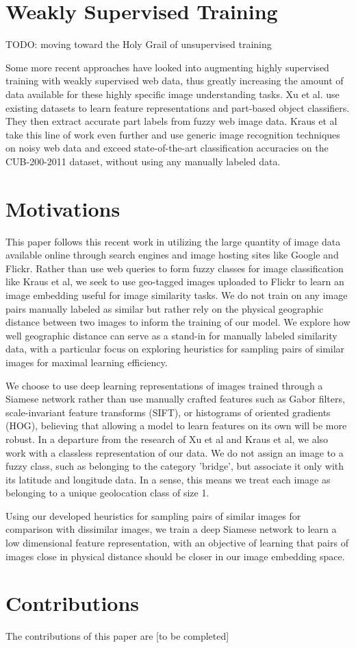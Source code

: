\section{Weakly Supervised Training}
TODO: moving toward the Holy Grail of unsupervised training

Some more recent approaches have looked into augmenting highly supervised training with weakly supervised web data, thus greatly increasing the amount of data available for these highly specific image understanding tasks. Xu et al.\cite{xu2015augmenting} use existing datasets to learn feature representations and part-based object classifiers. They then extract accurate part labels from fuzzy web image data. Kraus et al take this line of work even further and use generic image recognition techniques on noisy web data and exceed state-of-the-art classification accuracies on the CUB-200-2011 dataset, without using any manually labeled data.\cite{krause2016unreasonable}

\section{Motivations}
This paper follows this recent work in utilizing the large quantity of image data available online through search engines and image hosting sites like Google and Flickr. Rather than use web queries to form fuzzy classes for image classification like Kraus et al, we seek to use geo-tagged images uploaded to Flickr to learn an image embedding useful for image similarity tasks. We do not train on any image pairs manually labeled as similar but rather rely on the physical geographic distance between two images to inform the training of our model. We explore how well geographic distance can serve as a stand-in for manually labeled similarity data, with a particular focus on exploring heuristics for sampling pairs of similar images for maximal learning efficiency.

We choose to use deep learning representations of images trained through a Siamese network rather than use manually crafted features such as Gabor filters, scale-invariant feature transforms (SIFT), or histograms of oriented gradients (HOG), believing that allowing a model to learn features on its own will be more robust. In a departure from the research of Xu et al and Kraus et al, we also work with a classless representation of our data. We do not assign an image to a fuzzy class, such as belonging to the category 'bridge', but associate it only with its latitude and longitude data. In a sense, this means we treat each image as belonging to a unique geolocation class of size 1.

Using our developed heuristics for sampling pairs of similar images for comparison with dissimilar images, we train a deep Siamese network to learn a low dimensional feature representation, with an objective of learning that pairs of images close in physical distance should be closer in our image embedding space.

\section{Contributions}

The contributions of this paper are [to be completed]
